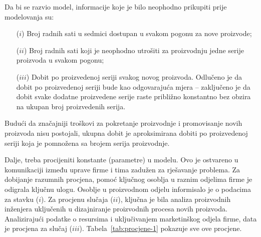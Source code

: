\documentclass[a4paper, utf8, 11pt, colorlinks]{book}
\begin{document}
Da bi se razvio model, informacije koje je bilo neophodno prikupiti prije modelovanja su:
\begin{itemize}
	\item[($i$)]   Broj radnih sati u sedmici dostupan u svakom pogonu za nove proizvode;  
	\item[($ii$)]   Broj radnih sati koji je neophodno utrošiti  za proizvodnju jedne serije proizvoda u svakom pogonu;
	\item[($iii$)] Dobit po proizvedenoj seriji svakog novog proizvoda. Odlučeno je da dobit po proizvedenoj seriji bude kao odgovarajuća mjera -- zaključeno je da   dobit svake dodatne proizvedene serije  raste približno konstantno bez obzira na ukupan broj proizvedenih serija.
\end{itemize} 

Budući da značajniji troškovi za pokretanje proizvodnje i promovisanje novih proizvoda nisu postojali, ukupna dobit je aproksimirana dobiti po proizvedenoj seriji koja je pomnožena sa brojem serija proizvodnje.  

Dalje, treba procijeniti konstante (parametre)  u modelu. Ovo je ostvareno u komunikaciji između uprave firme i tima zadužen za rješavanje problema. 
Za dobijanje razumnih procjena, pomoć ključnog osoblja u raznim odjelima firme je odigrala ključnu ulogu. Osoblje u proizvodnom odjelu informisalo  je o podacima za stavku ($i$). Za procjenu slučaja ($ii$), ključna je bila analiza proizvodnih inženjera uključenih u dizajniranje proizvodnih procesa novih proizvoda. Analizirajući podatke o resursima i uključivanjem  marketinškog odjela firme,  data je procjena za slučaj ($iii$). Tabela~\ref{tab:procjene-1} pokazuje sve ove procjene. 


\begin{table}[!ht]
    \centering
    \caption{Procjene konstanti modela.}
    \label{tab:procjene-1}
\end{table}
\end{document}
